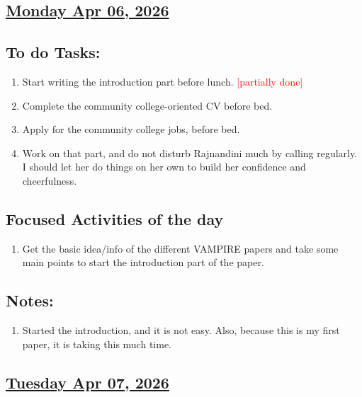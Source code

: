 \subsection*{\underline{Monday Apr 06, 2026}}
\subsection*{To do Tasks:}
\begin{enumerate}
    \item Start writing the introduction part before lunch. \textcolor{red}{[partially done]}
    \item Complete the community college-oriented CV before bed. \xmark
    \item Apply for the community college jobs, before bed. \xmark
    \item Work on that part, and do not disturb Rajnandini much by calling regularly. I should let her do things on her own to build her confidence and cheerfulness.\cmark  
\end{enumerate}
\subsection*{Focused Activities of the day}
\begin{enumerate}[\ding{212}]  
    \item Get the basic idea/info of the different VAMPIRE papers and take some main points to start the introduction part of the paper. 
\end{enumerate}
\subsection*{Notes:}
\begin{enumerate}
    \item Started the introduction, and it is not easy. Also, because this is my first paper, it is taking this much time. 
\end{enumerate}
\subsection*{\underline{Tuesday Apr 07, 2026}}
